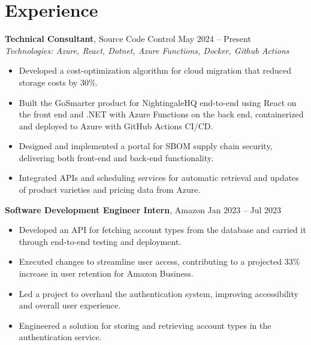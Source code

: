 \documentclass[11pt,a4paper]{article}
\begin{document}
\section{Experience}
\textbf{Technical Consultant}, Source Code Control \hfill May 2024 -- Present
\\ \textit{Technologies: Azure, React, Dotnet, Azure Functions, Docker, Github Actions}
\begin{itemize}
  \item Developed a cost-optimization algorithm for cloud migration that reduced storage costs by 30\%.
  \item Built the GoSmarter product for NightingaleHQ end-to-end using React on the front end and .NET with Azure Functions on the back end, containerized and deployed to Azure with GitHub Actions CI/CD.
  \item Designed and implemented a portal for SBOM supply chain security, delivering both front-end and back-end functionality.
  \item Integrated APIs and scheduling services for automatic retrieval and updates of product varieties and pricing data from Azure.
\end{itemize}
\vspace{2pt}
\textbf{Software Development Engineer Intern}, Amazon \hfill Jan 2023 -- Jul 2023
\begin{itemize}
  \item Developed an API for fetching account types from the database and carried it through end-to-end testing and deployment.
  \item Executed changes to streamline user access, contributing to a projected 33\% increase in user retention for Amazon Business.
  \item Led a project to overhaul the authentication system, improving accessibility and overall user experience.
  \item Engineered a solution for storing and retrieving account types in the authentication service.
\end{itemize}
\vspace{2pt}
\end{document}
